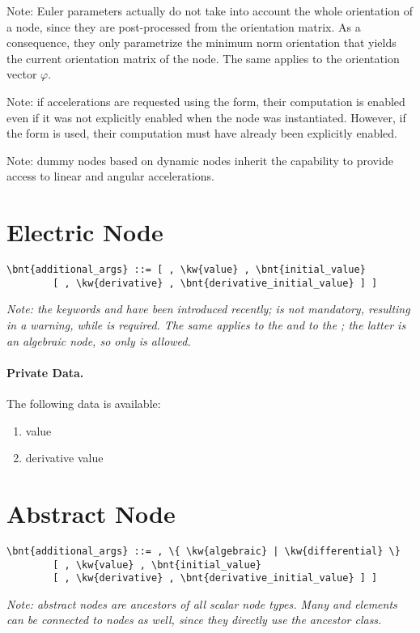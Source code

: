 Note: Euler parameters actually do not take into account 
the whole orientation of a node, since they are post-processed
from the orientation matrix.
As a consequence, they only parametrize the minimum norm orientation
that yields the current orientation matrix of the node.
The same applies to the orientation vector $\varphi$.

Note: if accelerations are requested using the  form,
their computation is enabled even if it was not explicitly enabled
when the node was instantiated.
However, if the  form is used, their computation must have
already been explicitly enabled.

Note: dummy nodes based on dynamic nodes inherit the capability to provide
access to linear and angular accelerations.


\section{Electric Node}
\begin{Verbatim}[commandchars=\\\{\}]
    \bnt{additional_args} ::= [ , \kw{value} , \bnt{initial_value}
        [ , \kw{derivative} , \bnt{derivative_initial_value} ] ]
\end{Verbatim}
\emph{Note: the keywords  and 
have been introduced recently;  is not mandatory,
resulting in a warning, while  is required.
The same applies to the  
and to the ; the latter is an algebraic
node, so only  is allowed.
}

\paragraph{Private Data.}
\label{sec:NODE:ELECTRIC:PRIV}
The following data is available:
\begin{enumerate}
\item {} value
\item {} derivative value
\end{enumerate}





\section{Abstract Node}
\begin{Verbatim}[commandchars=\\\{\}]
    \bnt{additional_args} ::= , \{ \kw{algebraic} | \kw{differential} \}
        [ , \kw{value} , \bnt{initial_value}
        [ , \kw{derivative} , \bnt{derivative_initial_value} ] ]
\end{Verbatim}
\emph{
	Note: abstract nodes are ancestors of all scalar node types.
	Many  and  elements can be connected
	to  nodes as well, since they directly use
	the ancestor class. 
}

